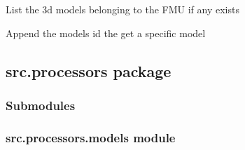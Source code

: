 \documentclass[letterpaper,10pt,english]{sphinxmanual}
\begin{document}

\begin{fulllineitems}
\label{\detokenize{src.fmus:src.fmus.views.fmu_models}}
List the 3d models belonging to the FMU if any exists

Append the models id the get a specific model

\end{fulllineitems}



\subsection{src.processors package}
\label{\detokenize{src.processors:src-processors-package}}\label{\detokenize{src.processors::doc}}

\subsubsection{Submodules}
\label{\detokenize{src.processors:submodules}}

\subsubsection{src.processors.models module}
\label{\detokenize{src.processors:module-src.processors.models}}\label{\detokenize{src.processors:src-processors-models-module}}
\end{document}
